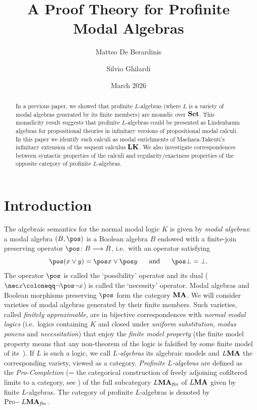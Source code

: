 \documentclass{article}
\title{A Proof Theory for Profinite Modal Algebras}
\author[1,3]{Matteo De Berardinis}
\author[2]{Silvio Ghilardi}
\affil[1]{University of Amsterdam}
\affil[2]{Università degli Studi di Milano}
\affil[3]{Università degli Studi di Salerno}
\date{March 2026}
\theoremstyle{definition}
\DeclareMathOperator{\Pro}{Pro-}
\newcommand{\MA}{\textup{\textbf{MA}}}
\newcommand{\fin}{\textit{fin}}
\begin{document}
\maketitle

\begin{abstract}
In a previous paper, we showed that profinite $L$-algebras (where $L$ is a variety of modal algebras generated by its finite members) are monadic over $\bf Set$. This monadicity result suggests that profinite $L$-algebras could be presented as Lindenbaum algebras for propositional theories in  infinitary versions of  propositional modal calculi. In this paper we  identify such calculi as modal enrichments of Maehara-Takeuti's infinitary extension of the sequent calculus $\bf LK$. We also investigate correspondences between syntactic properties of the calculi and regularity/exactness properties of the opposite category of profinite $L$-algebras.
\end{abstract}

\section{Introduction}
The algebraic semantics for the normal modal logic $K$ \cite{Modal} is given by \emph{modal algebras}: a modal algebra $(B,\pos)$ is a Boolean algebra $B$ endowed with a finite-join preserving operator $\pos \colon B \longrightarrow B$, i.e.\ with an operator satisfying
$$\pos (x \vee y) = \pos x \vee \pos y ~~~~~\text{and}~~~~~ \pos \bot = \bot.$$
The operator $\pos$ is called the ‘possibility’ operator and its dual ($\nec x \coloneqq \neg \pos \neg x$) is called the ‘necessity’ operator. Modal algebras and Boolean morphisms preserving $\pos$ form the category $\MA$.
We will consider varieties of modal algebras generated by their finite members. Such varieties, called 
\textit{finitely approximable},
are in bijective correspondences with \textit{normal modal logics} (i.e.\ logics containing $K$ and closed under \emph{uniform substitution}, \emph{modus ponens} and \emph{necessitation}) that enjoy the \textit{finite model property} (the finite model property means that any non-theorem of the logic is falsified by some finite model of its~\cite{Modal}). If $L$ is such a logic, we call $L$\emph{-algebras} its algebraic models and $L\MA$ the corresponding variety, viewed as a category. \emph{Profinite $L$-algebras} are defined as the \emph{Pro-Completion} (= the categorical construction of freely adjoining cofiltered limits to a category, see \cite{Stone}) of the full subcategory $L\MA_\fin$ of $L\MA$ given by finite $L$-algebras.
The category of profinite $L$-algebras is denoted by $\Pro L\MA_\fin$.
\end{document}
